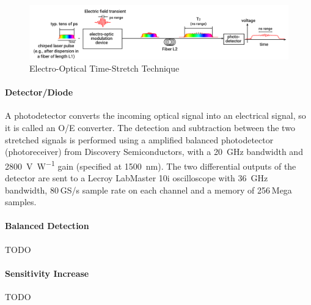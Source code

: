 \begin{figure}[tbh]
	\centering
	\includegraphics[width = \textwidth]{chap/02-theory/img/time_stretch.png}
	\caption{Electro-Optical Time-Stretch Technique \cite{szwaj}}
	\label{fig:eo_ts}
\end{figure}


\paragraph{Detector/Diode}
A photodetector converts the incoming optical signal into an electrical signal, so it is called an O/E converter.
The detection and subtraction between the two stretched signals is performed using a amplified balanced photodetector (photoreceiver) from Discovery Semiconductors, with a \SI{20}{\GHz} bandwidth and \SI{2800}{\volt\per\watt} gain (specified at \SI{1500}{\nano\meter}). %
The two differential outputs of the detector are sent to a Lecroy LabMaster 10i oscilloscope with \SI{36}{\GHz} bandwidth, 80 GS/s sample rate on each channel and a memory of 256 Mega samples. %

\paragraph{Balanced Detection}
TODO
\paragraph{Sensitivity Increase}
TODO

